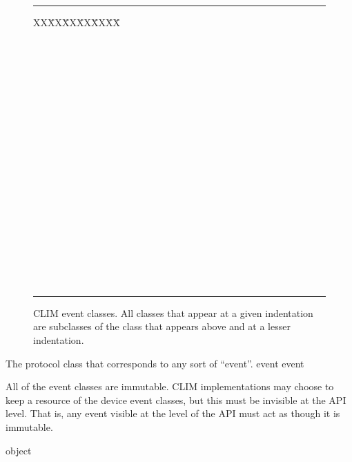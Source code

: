 \begin{figure}
\hrule
\begin{tabbing}
XX\=XX\=XX\=XX\=XX\=XX\=  \kill
{} \\
\>          \\
\>\>      \\
\>\>\>   \\
\>\>\> \\
\>\>       \\
\>\>\> \\
\>\>\>\>   \\
\>\>\>\> \\
\>\>\>\>    \\
\>\>\>  \\
\>\>\>\> \\
\>\>\>\>\> \\
\>\>\>\>\>  \\
\> \\
\>\> \\
\>\>       \\
\>           \\
\>\> \\
\> \\
\end{tabbing}
\caption{\label{event-hier} CLIM event classes.  All classes that appear
at a given indentation are subclasses of the class that appears above and at a
lesser indentation.} 
\vspace{2pc}
\hrule
\end{figure}


The protocol class that corresponds to any sort of ``event''.
 {event} {event}

All of the event classes are immutable.  CLIM implementations may choose to keep
a resource of the device event classes, but this must be invisible at the API
level.  That is, any event visible at the level of the API must act as though it
is immutable.

 {object}

